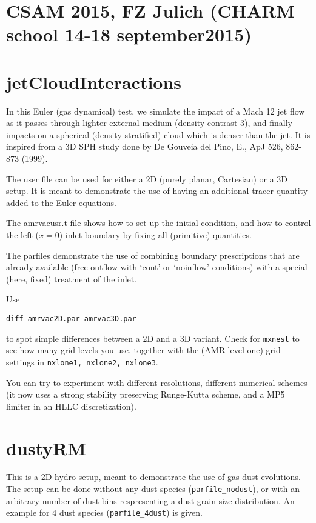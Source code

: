 \documentclass[10pt]{article}
\begin{document}
\section*{CSAM 2015, FZ Julich (CHARM school 14-18 september2015)}


\section*{jetCloudInteractions}
In this Euler (gas dynamical) test, we simulate the impact of a Mach 12 jet flow as it passes through lighter external medium (density contrast 3), and finally impacts on a spherical (density stratified) cloud which is denser than the jet. It is inspired from a 3D SPH study done by De Gouveia del Pino, E., ApJ 526, 862-873 (1999).

The user file can be used for either a 2D (purely planar, Cartesian) or a 3D setup. It is meant to demonstrate the use of having an additional tracer quantity added to the Euler equations.

The amrvacusr.t file shows how to set up the initial condition, and how to control the left ($x=0$) inlet boundary by fixing all (primitive) quantities.

The parfiles demonstrate the use of combining boundary prescriptions that are already available (free-outflow with `cont' or `noinflow' conditions) with a special (here, fixed) treatment of the inlet.

Use 
\begin{verbatim}
diff amrvac2D.par amrvac3D.par
\end{verbatim}
to spot simple differences between a 2D and a 3D variant. Check for {\tt mxnest} to see how many grid levels you use, together with the (AMR level one) grid settings in {\tt nxlone1, nxlone2, nxlone3}.

You can try to experiment with different resolutions, different numerical schemes (it now uses a strong stability preserving Runge-Kutta scheme, and a MP5 limiter in an HLLC discretization).


\section*{dustyRM}

This is a 2D hydro setup, meant to demonstrate the use of gas-dust evolutions. The setup can be done without any dust species ({\tt parfile\_nodust}), or with an arbitrary number of dust bins respresenting a dust grain size distribution. An example for 4 dust species ({\tt parfile\_4dust}) is given.
\end{document}
